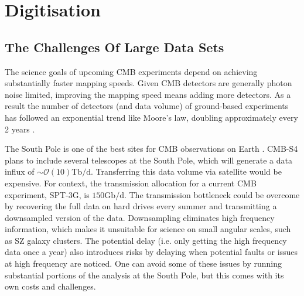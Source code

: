 \documentclass[apj]{emulateapj}
\begin{document}






\section{Digitisation}
\label{sec:dig}

\subsection{The Challenges Of Large Data Sets}
\label{subsec:problem}


The science goals of upcoming CMB experiments depend on achieving substantially faster mapping speeds. Given CMB detectors are generally photon noise limited, improving the mapping speed means adding more detectors. As a result the number of detectors (and data volume) of ground-based experiments has followed an exponential trend like Moore's law, doubling approximately every 2 years \citep{s4sciencebook, Abazajian2015}.

The South Pole is one of the best sites for CMB observations on Earth \citep{kovac2007}. CMB-S4 plans to include several telescopes at the South Pole, which will generate a data influx of $\sim\mathcal{O}(10)\mathrm{Tb/d}$. Transferring this data volume via satellite would be expensive. For context, the transmission allocation for a current CMB experiment, SPT-3G, is $150\mathrm{Gb/d}$. The transmission bottleneck could be overcome by recovering the full data on hard drives every summer and transmitting a downsampled version of the data. Downsampling eliminates high frequency information, which makes it unsuitable for science on small angular scales, such as SZ galaxy clusters. The potential delay (i.e. only getting the high frequency data once a year) also introduces risks by delaying when potential faults or issues at high frequency are noticed. One can avoid some of these issues by running substantial portions of the analysis at the South Pole, but this comes with its own costs and challenges.
\end{document}
